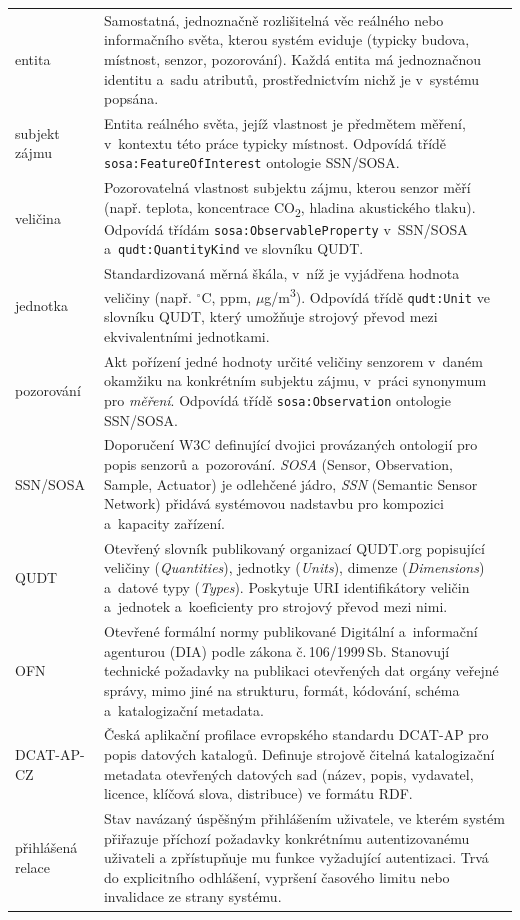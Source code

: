 \begin{longtable}{L{3.5cm} L{11cm}}
    entita & Samostatná, jednoznačně rozlišitelná věc reálného nebo informačního světa, kterou systém eviduje (typicky budova, místnost, senzor, pozorování). Každá entita má jednoznačnou identitu a~sadu atributů, prostřednictvím nichž je v~systému popsána. \\
    subjekt zájmu & Entita reálného světa, jejíž vlastnost je předmětem měření, v~kontextu této práce typicky místnost. Odpovídá třídě \texttt{sosa:FeatureOfInterest} ontologie SSN/SOSA. \\
    veličina & Pozorovatelná vlastnost subjektu zájmu, kterou senzor měří (např. teplota, koncentrace CO\textsubscript{2}, hladina akustického tlaku). Odpovídá třídám \texttt{sosa:ObservableProperty} v~SSN/SOSA a~\texttt{qudt:QuantityKind} ve slovníku QUDT. \\
    jednotka & Standardizovaná měrná škála, v~níž je vyjádřena hodnota veličiny (např. $^{\circ}$C, ppm, $\mu$g/m\textsuperscript{3}). Odpovídá třídě \texttt{qudt:Unit} ve slovníku QUDT, který umožňuje strojový převod mezi ekvivalentními jednotkami. \\
    pozorování & Akt pořízení jedné hodnoty určité veličiny senzorem v~daném okamžiku na konkrétním subjektu zájmu, v~práci synonymum pro \emph{měření}. Odpovídá třídě \texttt{sosa:Observation} ontologie SSN/SOSA. \\
    SSN/SOSA & Doporučení W3C definující dvojici provázaných ontologií pro popis senzorů a~pozorování. \emph{SOSA} (Sensor, Observation, Sample, Actuator) je odlehčené jádro, \emph{SSN} (Semantic Sensor Network) přidává systémovou nadstavbu pro kompozici a~kapacity zařízení. \\
    QUDT & Otevřený slovník publikovaný organizací QUDT.org popisující veličiny (\emph{Quantities}), jednotky (\emph{Units}), dimenze (\emph{Dimensions}) a~datové typy (\emph{Types}). Poskytuje URI identifikátory veličin a~jednotek a~koeficienty pro strojový převod mezi nimi. \\
    OFN & Otevřené formální normy publikované Digitální a~informační agenturou (DIA) podle zákona č.\,106/1999\,Sb. Stanovují technické požadavky na publikaci otevřených dat orgány veřejné správy, mimo jiné na strukturu, formát, kódování, schéma a~katalogizační metadata. \\
    DCAT-AP-CZ & Česká aplikační profilace evropského standardu DCAT-AP pro popis datových katalogů. Definuje strojově čitelná katalogizační metadata otevřených datových sad (název, popis, vydavatel, licence, klíčová slova, distribuce) ve formátu RDF. \\
    přihlášená relace & Stav navázaný úspěšným přihlášením uživatele, ve kterém systém přiřazuje příchozí požadavky konkrétnímu autentizovanému uživateli a zpřístupňuje mu funkce vyžadující autentizaci. Trvá do explicitního odhlášení, vypršení časového limitu nebo invalidace ze strany systému. \\
\end{longtable}

